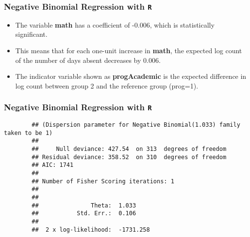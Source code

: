 \documentclass[MASTER.tex]{subfiles}
\begin{document}
\begin{frame}[fragile]
	\frametitle{Negative Binomial Regression with \texttt{R} }
	\Large
	\begin{itemize}
		\item The variable \textbf{math} has a coefficient of -0.006, which is statistically significant.
		\item This means that for each one-unit increase in \textbf{math}, the expected log count of the number of days absent decreases by 0.006. 
		\item The indicator variable shown as \textbf{progAcademic} is the expected difference in log count between group 2 and the reference group (prog=1). 
	\end{itemize}
\end{frame}
\begin{frame}[fragile]
	\frametitle{Negative Binomial Regression with \texttt{R} }

		\begin{verbatim}
		## (Dispersion parameter for Negative Binomial(1.033) family taken to be 1)
		## 
		##     Null deviance: 427.54  on 313  degrees of freedom
		## Residual deviance: 358.52  on 310  degrees of freedom
		## AIC: 1741
		## 
		## Number of Fisher Scoring iterations: 1
		## 
		## 
		##               Theta:  1.033 
		##           Std. Err.:  0.106 
		## 
		##  2 x log-likelihood:  -1731.258
		\end{verbatim}

\end{frame}
\end{document}
